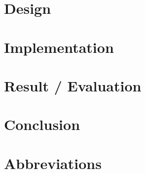 \documentclass[12pt,twoside]{kau_report}
\begin{document}
\section{Design}
\label{sec:design}

\cleardoublepage

\section{Implementation}
\label{sec:implementation}

\cleardoublepage

\section{Result / Evaluation}
\label{sec:resultevaluation}

\cleardoublepage

\section{Conclusion}
\label{sec:conclusion}

\cleardoublepage

\section{Abbreviations}
\label{sec:abbreviations}

\cleardoublepage


\begin{singlespace}


\end{singlespace}


\end{document}
